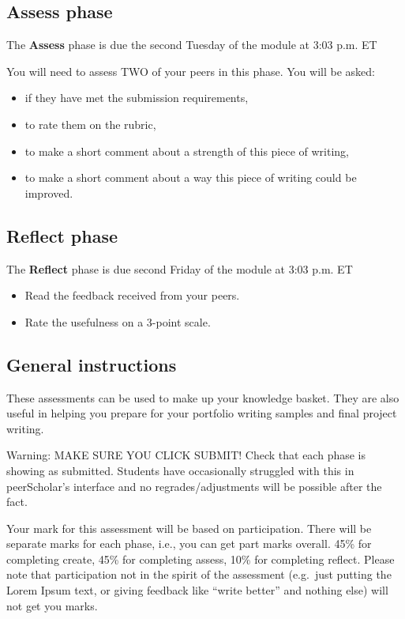 \documentclass[
  openany]{book}
\begin{document}
\hypertarget{assess-phase}{%
\subsection{Assess phase}\label{assess-phase}}

The \textbf{Assess} phase is due the second Tuesday of the module at 3:03 p.m. ET

You will need to assess TWO of your peers in this phase. You will be asked:

\begin{itemize}
\item
  if they have met the submission requirements,
\item
  to rate them on the rubric,
\item
  to make a short comment about a strength of this piece of writing,
\item
  to make a short comment about a way this piece of writing could be improved.
\end{itemize}

\hypertarget{reflect-phase}{%
\subsection{Reflect phase}\label{reflect-phase}}

The \textbf{Reflect} phase is due second Friday of the module at 3:03 p.m. ET

\begin{itemize}
\item
  Read the feedback received from your peers.
\item
  Rate the usefulness on a 3-point scale.
\end{itemize}

\hypertarget{general-instructions}{%
\subsection{General instructions}\label{general-instructions}}

These assessments can be used to make up your knowledge basket. They are also useful in helping you prepare for your portfolio writing samples and final project writing.

Warning: MAKE SURE YOU CLICK SUBMIT! Check that each phase is showing as submitted. Students have occasionally struggled with this in peerScholar's interface and no regrades/adjustments will be possible after the fact.

Your mark for this assessment will be based on participation. There will be separate marks for each phase, i.e., you can get part marks overall. 45\% for completing create, 45\% for completing assess, 10\% for completing reflect. Please note that participation not in the spirit of the assessment (e.g.~just putting the Lorem Ipsum text, or giving feedback like ``write better'' and nothing else) will not get you marks.
\end{document}
